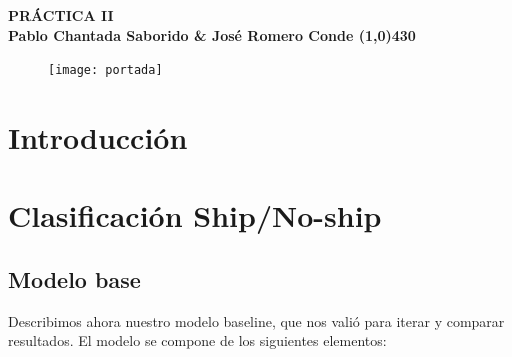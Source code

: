 \documentclass{article}
\begin{document}
	\begin{center}
		\LARGE\bfseries PRÁCTICA II\\
		\small Pablo Chantada Saborido \& José Romero Conde
		\line(1,0){430}
	\end{center}
	
\vspace*{380pt}
	
\begin{figure}[h]
	\centering
	\texttt{[image: portada]}
	\label{fig:portada}
\end{figure}
	
\thispagestyle{empty}
	
\newpage
	
	
	
\section*{Introducción}

\section*{Clasificación Ship/No-ship}
\subsection*{Modelo base}

Describimos ahora nuestro modelo baseline, que nos valió para iterar y comparar resultados. El modelo se compone de los siguientes elementos:
\end{document}
